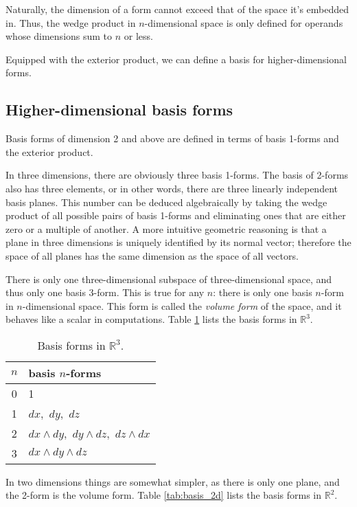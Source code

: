 \documentclass[utf8,english]{gradu3}
\begin{document}
Naturally, the dimension of a form cannot exceed that of the space it's embedded in.
Thus, the wedge product in $n$-dimensional space
is only defined for operands whose dimensions sum to $n$ or less.

Equipped with the exterior product,
we can define a basis for higher-dimensional forms.

\subsection{Higher-dimensional basis forms}\label{sec:basis_higher}

Basis forms of dimension 2 and above
are defined in terms of basis 1-forms and the exterior product.

In three dimensions, there are obviously three basis 1-forms.
The basis of 2-forms also has three elements,
or in other words, there are three linearly independent basis planes.
This number can be deduced algebraically
by taking the wedge product of all possible pairs of basis 1-forms
and eliminating ones that are either zero or a multiple of another.
A more intuitive geometric reasoning is that 
a plane in three dimensions is uniquely identified by its normal vector;
therefore the space of all planes has the same dimension as the space of all vectors.

There is only one three-dimensional subspace of three-dimensional space,
and thus only one basis 3-form.
This is true for any $n$:
there is only one basis $n$-form in $n$-dimensional space.
This form is called the \textit{volume form} of the space,
and it behaves like a scalar in computations.
Table \ref{tab:basis_3d} lists the basis forms in $\mathbb{R}^3$.

\begin{table}[h]
  \begin{tabular}{c | l}
    $n$ & basis $n$-forms \\
    \hline
    0 & 1 \\
    1 & $dx$,\, $dy$,\, $dz$ \\
    2 & $dx \wedge dy$,\, $dy \wedge dz$,\, $dz \wedge dx$ \\
    3 & $dx \wedge dy \wedge dz$ \\
  \end{tabular}
  \caption{Basis forms in $\mathbb{R}^3$.}
  \label{tab:basis_3d}
\end{table}

In two dimensions things are somewhat simpler,
as there is only one plane, and the 2-form is the volume form.
Table \ref{tab:basis_2d} lists the basis forms in $\mathbb{R}^2$.
\end{document}
